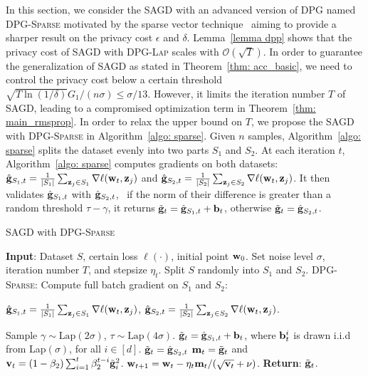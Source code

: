 \documentclass[11pt]{article}
\begin{document}
In this section, we consider the \textsc{SAGD} with an advanced version of \textsc{DPG} named \textsc{DPG-Sparse} motivated by the sparse vector technique~\citep{dwro2014} aiming to provide a sharper result on the privacy cost $\epsilon$ and $\delta$.
Lemma~\ref{lemma dpp} shows that the privacy cost of \textsc{SAGD} with \textsc{DPG-Lap} scales with $\mathcal{O}(\sqrt{T})$. In order to guarantee the generalization of \textsc{SAGD} as stated in Theorem~\ref{thm: acc_basic}, we need to control the privacy cost below a certain threshold \ie $\sqrt{T \ln(1/\delta)} G_1/(n\sigma) \leq \sigma/13$. However, it limits the iteration number $T$ of \textsc{SAGD}, leading to a compromised optimization term in Theorem~\ref{thm: main_rmsprop}.  
In order to relax the upper bound on $T$, we propose the \textsc{SAGD} with \textsc{DPG-Sparse} in Algorithm~\ref{algo: sparse}.
Given $n$ samples, Algorithm~\ref{algo: sparse} splits the dataset evenly into two parts $S_1$ and $S_2$. 
At each iteration $t$, Algorithm~\ref{algo: sparse} computes gradients on both datasets:
$\hat {\mathbf{g}}_{S_1,t} = \frac{1}{|S_1|} \sum_{\mathbf{z}_j \in S_1}\nabla \ell(\mathbf{w}_t, \mathbf{z}_j)$ and $\hat {\mathbf{g}}_{S_2,t} = \frac{1}{|S_2|} \sum_{\mathbf{z}_j \in S_2}\nabla \ell(\mathbf{w}_t, \mathbf{z}_j)$.
It then validates $\hat {\mathbf{g}}_{S_1,t} $ with $\hat {\mathbf{g}}_{S_2,t}$, \ie\ if the norm of their difference is greater than a random threshold $\tau-\gamma$, it returns $\tilde {\mathbf{g}}_t = \hat {\mathbf{g}}_{S_1,t} + \mathbf{b}_t$, otherwise $\tilde {\mathbf{g}}_t = \hat {\mathbf{g}}_{S_2,t}$.

\begin{algorithm}[H]
\caption{\textsc{SAGD} with \textsc{DPG-Sparse}}
\begin{algorithmic}[1]
\label{algo: sparse}
\STATE \textbf{Input}: Dataset $S$,  certain loss $\ell(\cdot)$, initial point $\mathbf{w}_0$.
\STATE Set  noise level $\sigma$, iteration number $T$,  and stepsize $\eta_t$.
\STATE Split $S$ randomly into $S_1$ and $S_2$. 
\STATE   \textsc{DPG-Sparse:} Compute full batch gradient on $S_1$ and $S_2$:\\
\centerline{$\hat {\mathbf{g}}_{S_1,t} = \frac{1}{|S_1|} \sum_{\mathbf{z}_j \in S_1}\nabla \ell(\mathbf{w}_t, \mathbf{z}_j)$,%
\hspace{0.2in}
$\hat {\mathbf{g}}_{S_2,t} = \frac{1}{|S_2|} \sum_{\mathbf{z}_j \in S_2}\nabla \ell(\mathbf{w}_t, \mathbf{z}_j)$.}
\STATE Sample $\gamma \sim \text{Lap}(2\sigma)$, $\tau \sim \text{Lap}(4\sigma)$.
\STATE  $\tilde {\mathbf{g}}_t = \hat {\mathbf{g}}_{S_1,t} + \mathbf{b}_t$, where $\mathbf{b}_t^i$ is drawn i.i.d from Lap$(\sigma)$, for all $ i \in [d]$.
\ELSE \STATE $\tilde {\mathbf{g}}_t = \hat {\mathbf{g}}_{S_2,t}$
\ENDIF
\STATE 
$\mathbf{m}_t = \tilde {\mathbf{g}}_t$ and $\mathbf{v}_t = \left(1-\beta_{2}\right) \sum_{i=1}^{t} \beta_{2}^{t-i} \tilde {\mathbf{g}}_{i}^{2}$.
\STATE $\mathbf{w}_{t+1}=\mathbf{w}_{t}-\eta_t \mathbf{m}_t /(\sqrt{\mathbf{v}_t}+\nu)$.
\ENDFOR 
\STATE \textbf{Return}: $\tilde {\mathbf{g}}_t$.
\end{algorithmic}
\end{algorithm}
\end{document}
